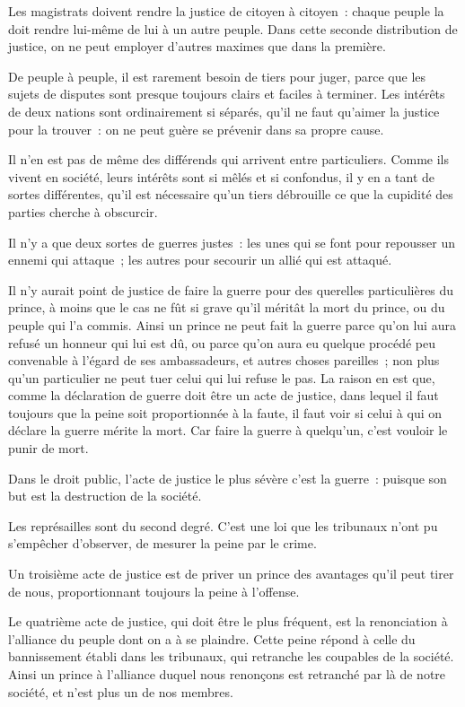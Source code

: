 \documentclass[french,twoside]{book} %
\begin{document}
\noindent Les magistrats doivent rendre la justice de citoyen à citoyen : chaque peuple la doit rendre lui-même de lui à un autre peuple. Dans cette seconde distribution de justice, on ne peut employer d’autres maximes que dans la première.\par
De peuple à peuple, il est rarement besoin de tiers pour juger, parce que les sujets de disputes sont presque toujours clairs et faciles à terminer. Les intérêts de deux nations sont ordinairement si séparés, qu’il ne faut qu’aimer la justice pour la trouver : on ne peut guère se prévenir dans sa propre cause.\par
Il n’en est pas de même des différends qui arrivent entre particuliers. Comme ils vivent en société, leurs intérêts sont si mêlés et si confondus, il y en a tant de sortes différentes, qu’il est nécessaire qu’un tiers débrouille ce que la cupidité des parties cherche à obscurcir.\par
Il n’y a que deux sortes de guerres justes : les unes qui se font pour repousser un ennemi qui attaque ; les autres pour secourir un allié qui est attaqué.\par
Il n’y aurait point de justice de faire la guerre pour des querelles particulières du prince, à moins que le cas ne fût si grave qu’il méritât la mort du prince, ou du peuple qui l’a commis. Ainsi un prince ne peut fait la guerre parce qu’on lui aura refusé un honneur qui lui est dû, ou parce qu’on aura eu quelque procédé peu convenable à l’égard de ses ambassadeurs, et autres choses pareilles ; non plus qu’un particulier ne peut tuer celui qui lui refuse le pas. La raison en est que, comme la déclaration de guerre doit être un acte de justice, dans lequel il faut toujours que la peine soit proportionnée à la faute, il faut voir si celui à qui on déclare la guerre mérite la mort. Car faire la guerre à quelqu’un, c’est vouloir le punir de mort.\par
Dans le droit public, l’acte de justice le plus sévère c’est la guerre : puisque son but est la destruction de la société.\par
Les représailles sont du second degré. C’est une loi que les tribunaux n’ont pu s’empêcher d’observer, de mesurer la peine par le crime.\par
Un troisième acte de justice est de priver un prince des avantages qu’il peut tirer de nous, proportionnant toujours la peine à l’offense.\par
Le quatrième acte de justice, qui doit être le plus fréquent, est la renonciation à l’alliance du peuple dont on a à se plaindre. Cette peine répond à celle du bannissement établi dans les tribunaux, qui retranche les coupables de la société. Ainsi un prince à l’alliance duquel nous renonçons est retranché par là de notre société, et n’est plus un de nos membres.\par
\end{document}

